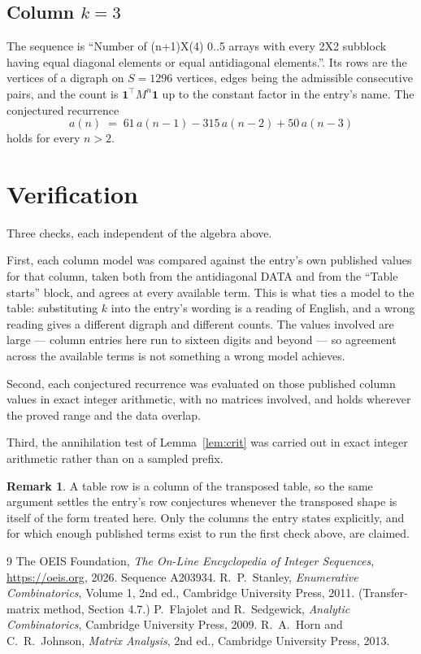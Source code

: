 \documentclass[11pt,a4paper]{article}
\theoremstyle{plain}
\theoremstyle{definition}
\newtheorem{remark}[theorem]{Remark}
\begin{document}
\subsection*{Column $k=3$}
The sequence is ``Number of (n+1)X(4) 0..5 arrays with every 2X2 subblock having equal diagonal elements or equal antidiagonal elements.''. Its rows are the vertices of a digraph on
$S=1296$ vertices, edges being the admissible consecutive pairs, and the count is
$\mathbf{1}^{\!\top}M^{n}\mathbf{1}$ up to the constant factor in the entry's name.
The conjectured recurrence
\[
a(n)\;=\;61\,a(n-1) - 315\,a(n-2) + 50\,a(n-3)
\]
holds for every $n>2$.

\section{Verification}

Three checks, each independent of the algebra above.

First, each column model was compared against the entry's own published values for that
column, taken both from the antidiagonal DATA and from the ``Table starts'' block, and agrees
at every available term. This is what ties a model to the table: substituting $k$ into the
entry's wording is a reading of English, and a wrong reading gives a different digraph and
different counts. The values involved are large --- column entries here run to sixteen digits
and beyond --- so agreement across the available terms is not something a wrong model
achieves.

Second, each conjectured recurrence was evaluated on those published column values in exact
integer arithmetic, with no matrices involved, and holds wherever the proved range and the
data overlap.

Third, the annihilation test of Lemma~\ref{lem:crit} was carried out in exact integer
arithmetic rather than on a sampled prefix.

\begin{remark}
A table row is a column of the transposed table, so the same argument settles the entry's row
conjectures whenever the transposed shape is itself of the form treated here. Only the columns
the entry states explicitly, and for which enough published terms exist to run the first check
above, are claimed.
\end{remark}

\begin{thebibliography}{9}
 The OEIS Foundation, \emph{The On-Line Encyclopedia of Integer
Sequences}, \url{https://oeis.org}, 2026. Sequence A203934.
 R.~P.~Stanley, \emph{Enumerative Combinatorics}, Volume 1, 2nd ed.,
Cambridge University Press, 2011. (Transfer-matrix method, Section 4.7.)
 P.~Flajolet and R.~Sedgewick, \emph{Analytic Combinatorics}, Cambridge
University Press, 2009.
 R.~A.~Horn and C.~R.~Johnson, \emph{Matrix Analysis}, 2nd ed., Cambridge
University Press, 2013.
\end{thebibliography}
\end{document}
